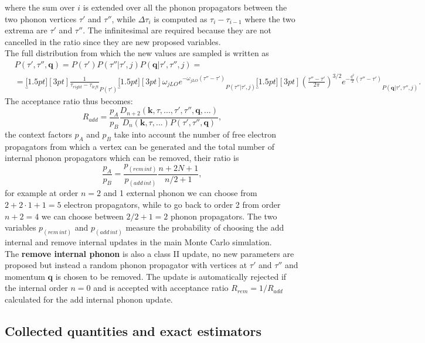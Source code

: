 where the sum over $i$ is extended over all the phonon propagators between the two phonon vertices $\tau'$ and $\tau''$, while $\Delta\tau_i$ is computed as $\tau_i-\tau_{i-1}$ where the two 
extrema are $\tau'$ and $\tau''$. The infinitesimal are required because they are not cancelled in the ratio since they are new proposed variables.\\
The full distribution from which the new values are sampled is written as
\begin{equation}
\begin{split}
    &P(\tau',\tau'',\mathbf{q})=P(\tau')P(\tau''|\tau',j)P(\mathbf{q}|\tau',\tau'',j)=\\
    &=\underbracket[1.5pt][3pt]{\frac{1}{\tau_{right}-\tau_{left}}}_{P(\tau')}\underbracket[1.5pt][3pt]{\omega_{jLO}e^{-\omega_{jLO}(\tau''-\tau')}}_{P(\tau''|\tau',j)}
    \underbracket[1.5pt][3pt]{\left(\frac{\tau''-\tau'}{2\pi}\right)^{3/2}e^{-\frac{q^2}{2}(\tau''-\tau')}}_{P(\mathbf{q}|\tau',\tau'',j)}.
\end{split}
\end{equation}
The acceptance ratio thus becomes:
\begin{equation}
    R_{add}=\frac{p_A}{p_B}\frac{D_{n+2}(\mathbf{k},\tau,...,\tau',\tau'',\mathbf{q},...)}{D_n(\mathbf{k},\tau,...)P(\tau',\tau'',\mathbf{q})},
\end{equation}
the context factors $p_A$ and $p_B$ take into account the number of free electron propagators from which a vertex can be generated and the total number of internal phonon propagators 
which can be removed, their ratio is
\begin{equation}
    \frac{p_A}{p_B}=\frac{p_{(rem\hspace{2pt}int)}}{p_{(add\hspace{2pt}int)}}\frac{n+2N+1}{n/2+1},
\end{equation}
for example at order $n=2$ and 1 external phonon we can choose from $2+2\cdot1+1=5$ electron propagators, while to go back to 
order 2 from order $n+2=4$ we can choose between $2/2+1=2$ phonon propagators. The two variables $p_{(rem\hspace{2pt}int)}$ and 
$p_{(add\hspace{2pt}int)}$ measure the probability of choosing the add internal and remove internal updates in the main Monte Carlo simulation.\\
The \textbf{remove internal phonon} is also a class II update, no new parameters are proposed but instead a random phonon propagator with 
vertices at $\tau'$ and $\tau''$ and momentum $\mathbf{q}$ is chosen to be removed. The update is automatically rejected if the internal order $n=0$ and 
is accepted with acceptance ratio $R_{rem}=1/R_{add}$ calculated for the add internal phonon update.\\
\subsection{Collected quantities and exact estimators}
